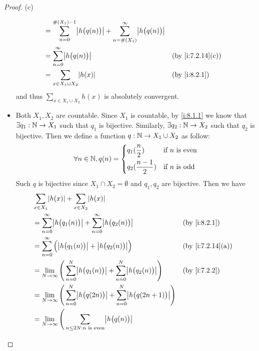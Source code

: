 \begin{proof}{(c)}
\begin{itemize}
\begin{align*}
             & = \sum_{n = 0}^{\#(X_1) - 1} \abs{h\big(q(n)\big)} + \sum_{n = \#(X_1)}^\infty \abs{h\big(q(n)\big)}                       \\
             & = \sum_{n = 0}^\infty \abs{h\big(q(n)\big)}                                                          &  & \by{i:7.2.14}[c] \\
             & = \sum_{x \in X_1 \cup X_2} \abs{h(x)}                                                               &  & \by{i:8.2.1}
          \end{align*}
          and thus \(\sum_{x \in X_1 \cup X_2} h(x)\) is absolutely convergent.
    \item Both \(X_1, X_2\) are countable.
          Since \(X_1\) is countable, by \cref{i:8.1.1} we know that \(\exists q_1 : \mathbb{N} \to X_1\) such that \(q_1\) is bijective.
          Similarly, \(\exists q_2 : \mathbb{N} \to X_2\) such that \(q_2\) is bijective.
          Then we define a function \(q : \mathbb{N} \to X_1 \cup X_2\) as follow:
          \[
            \forall n \in \mathbb{N}, q(n) = \begin{dcases}
              q_1(\dfrac{n}{2})     & \text{if } n \text{ is even} \\
              q_2(\dfrac{n - 1}{2}) & \text{if } n \text{ is odd}
            \end{dcases}
          \]
          Such \(q\) is bijective since \(X_1 \cap X_2 = \emptyset\) and \(q_1, q_2\) are bijective.
          Then we have
          \begin{align*}
             & \sum_{x \in X_1} \abs{h(x)} + \sum_{x \in X_2} \abs{h(x)}                                                                                 \\
             & = \sum_{n = 0}^\infty \abs{h\big(q_1(n)\big)} + \sum_{n = 0}^\infty \abs{h\big(q_2(n)\big)}                         &  & \by{i:8.2.1}     \\
             & = \sum_{n = 0}^\infty \Big(\abs{h\big(q_1(n)\big)} + \abs{h\big(q_2(n)\big)}\Big)                                   &  & \by{i:7.2.14}[a] \\
             & = \lim_{N \to \infty} \Bigg(\sum_{n = 0}^N \abs{h\big(q_1(n)\big)} + \sum_{n = 0}^N \abs{h\big(q_2(n)\big)}\Bigg)   &  & \by{i:7.2.2}     \\
             & = \lim_{N \to \infty} \Bigg(\sum_{n = 0}^N \abs{h\big(q(2n)\big)} + \sum_{n = 0}^N \abs{h\big(q(2n + 1)\big)}\Bigg)                       \\
             & = \lim_{N \to \infty} \Bigg(\sum_{n \leq 2N : n \text{ is even}} \abs{h\big(q(n)\big)}                                                    \\

\end{align*}
\end{itemize}
\end{proof}
